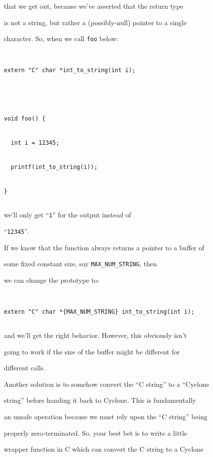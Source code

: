 that we get out, because we've asserted that the return type


is not a string, but rather a (possibly-null) pointer to a single


character.  So, when we call \texttt{foo} below:


\begin{verbatim}


extern "C" char *int_to_string(int i);





void foo() {


  int i = 12345;


  printf(int_to_string(i));


}


\end{verbatim}


we'll only get ``\texttt{1}'' for the output instead of


``\texttt{12345}''.  





If we know that the function always returns a pointer to a buffer of 


some fixed constant size, say \texttt{MAX\_NUM\_STRING}, then


we can change the prototype to:


\begin{verbatim}


extern "C" char *{MAX_NUM_STRING} int_to_string(int i);


\end{verbatim}


and we'll get the right behavior.  However, this obviously isn't


going to work if the size of the buffer might be different for


different calls.  





Another solution is to somehow convert the ``C string'' to a ``Cyclone


string'' before handing it back to Cyclone.  This is fundamentally


an unsafe operation because we must rely upon the ``C string'' being


properly zero-terminated.  So, your best bet is to write a little


wrapper function in C which can convert the C string to a Cyclone


